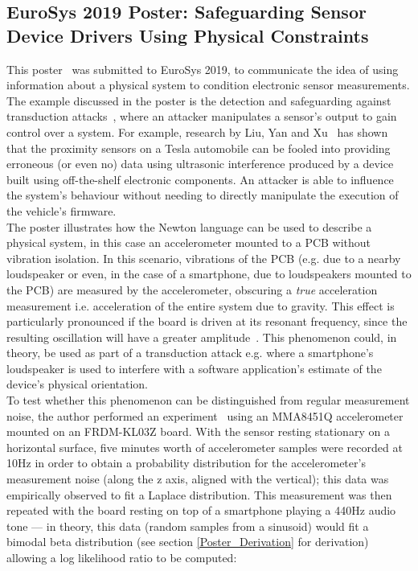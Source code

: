 \documentclass[12pt]{article}
\begin{document}
\begin{appendix}
  \section{EuroSys 2019 Poster: Safeguarding Sensor Device Drivers Using Physical Constraints} \label{poster_appendix}
    This poster~\cite{eurosys_poster} was submitted to EuroSys 2019, to communicate the idea of using information about a physical system to condition electronic sensor measurements. The example discussed in the poster is the detection and safeguarding against transduction attacks~\cite{Fu_2018}, where an attacker manipulates a sensor's output to gain control over a system. For example, research by Liu, Yan and Xu~\cite{autonomous_vehicles} has shown that the proximity sensors on a Tesla automobile can be fooled into providing erroneous (or even no) data using ultrasonic interference produced by a device built using off-the-shelf electronic components. An attacker is able to influence the system's behaviour without needing to directly manipulate the execution of the vehicle's firmware.\\

    The poster illustrates how the Newton language can be used to describe a physical system, in this case an accelerometer mounted to a PCB without vibration isolation. In this scenario, vibrations of the PCB (e.g. due to a nearby loudspeaker or even, in the case of a smartphone, due to loudspeakers mounted to the PCB) are measured by the accelerometer, obscuring a \textit{true} acceleration measurement i.e. acceleration of the entire system due to gravity. This effect is particularly pronounced if the board is driven at its resonant frequency, since the resulting oscillation will have a greater amplitude~\cite{adi}. This phenomenon could, in theory, be used as part of a transduction attack e.g. where a smartphone's loudspeaker is used to interfere with a software application's estimate of the device's physical orientation.\\

    To test whether this phenomenon can be distinguished from regular measurement noise, the author performed an experiment~\cite{poster_experiment} using an MMA8451Q accelerometer mounted on an FRDM-KL03Z board. With the sensor resting stationary on a horizontal surface, five minutes worth of accelerometer samples were recorded at 10Hz in order to obtain a probability distribution for the accelerometer's measurement noise (along the z axis, aligned with the vertical); this data was empirically observed to fit a Laplace distribution. This measurement was then repeated with the board resting on top of a smartphone playing a 440Hz audio tone --- in theory, this data (random samples from a sinusoid) would fit a bimodal beta distribution (see section \ref{Poster_Derivation} for derivation) allowing a log likelihood ratio to be computed:


\end{appendix}
\end{document}
